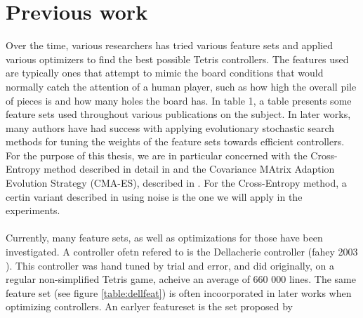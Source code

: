 \section{Previous work}

Over the time, various researchers has tried various feature 
sets and applied various optimizers to find the best 
possible Tetris controllers. The features used are typically
ones that attempt to mimic the board conditions that would
normally catch the attention of a human player, such as
how high the overall pile of pieces is and how many holes 
the board has. In \cite{scherrer2009:b} table 1, a table 
presents some feature sets used throughout various publications
on the subject. In later works, many authors have had success
with applying evolutionary stochastic search methods for tuning 
the weights of the feature sets towards
efficient controllers. For the purpose of this thesis,
we are in particular concerned with the 
Cross-Entropy method described in detail in \citep{cetut2014} and the
Covariance MAtrix Adaption Evolution Strategy (CMA-ES), described 
in \cite{hansen2011}. For the Cross-Entropy method,
a certin variant described in \cite{szita:06} using noise
is the one we will apply in the experiments.\\
\\
Currently, many feature sets, as well as optimizations for those have been
investigated. A controller ofetn refered to is the Dellacherie controller 
(fahey 2003 \citep{fahey}). This controller was hand tuned by trial and error,
and did originally, on a regular non-simplified Tetris game, acheive an average of
660 000 lines. The same feature set (see figure \ref{table:dellfeat}) is 
often incoorporated in later works when optimizing controllers. An earlyer
featureset is the set proposed by  \citep{Bertsekas}


